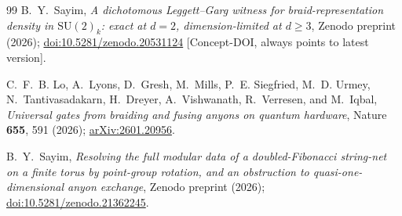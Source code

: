 \documentclass[aps,pra,twocolumn,superscriptaddress,longbibliography,floatfix,nofootinbib]{revtex4-2}
\begin{document}
\begin{thebibliography}{99}
B.~Y.~Sayim,
\emph{A dichotomous Leggett--Garg witness for braid-representation
density in $\mathrm{SU}(2)_k$: exact at $d=2$, dimension-limited at
$d\ge3$},
Zenodo preprint (2026);
\href{https://doi.org/10.5281/zenodo.20531124}{doi:10.5281/zenodo.20531124}
[Concept-DOI, always points to latest version].

C.~F.~B. Lo, A.~Lyons, D.~Gresh, M.~Mills, P.~E. Siegfried, M.~D. Urmey,
N.~Tantivasadakarn, H.~Dreyer, A.~Vishwanath, R.~Verresen, and M.~Iqbal,
\emph{Universal gates from braiding and fusing anyons on quantum
hardware},
Nature \textbf{655}, 591 (2026);
\href{https://arxiv.org/abs/2601.20956}{arXiv:2601.20956}.

B.~Y.~Sayim,
\emph{Resolving the full modular data of a doubled-Fibonacci string-net on a finite torus by
point-group rotation, and an obstruction to quasi-one-dimensional anyon exchange},
Zenodo preprint (2026);
\href{https://doi.org/10.5281/zenodo.21362245}{doi:10.5281/zenodo.21362245}.

\end{thebibliography}
\end{document}
